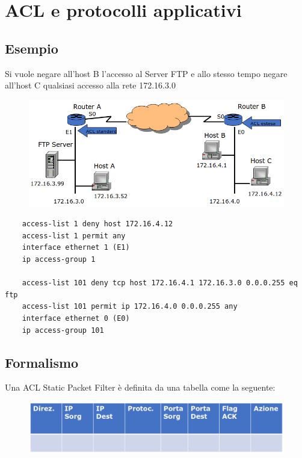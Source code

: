 \newpage
\section{ACL e protocolli applicativi}

\subsection{Esempio}
Si vuole negare all'host B l'accesso al Server FTP e allo stesso tempo negare all'host C 
qualsiasi accesso alla rete 172.16.3.0

\begin{figure}[H]
    \centering
    \includegraphics[width=1\linewidth]{chapters/11/images/esempio.png}
\end{figure}

\begin{lstlisting}
    access-list 1 deny host 172.16.4.12 
    access-list 1 permit any
    interface ethernet 1 (E1)
    ip access-group 1

    access-list 101 deny tcp host 172.16.4.1 172.16.3.0 0.0.0.255 eq ftp 
    access-list 101 permit ip 172.16.4.0 0.0.0.255 any 
    interface ethernet 0 (E0)
    ip access-group 101
\end{lstlisting}

\subsection{Formalismo}
Una ACL Static Packet Filter è definita da una tabella come la seguente:

\begin{figure}[H]
    \centering
    \includegraphics[width=1\linewidth]{chapters/11/images/tabella.png}
\end{figure}

